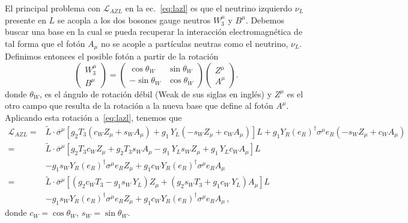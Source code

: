 El principal problema con $\mathcal{L}_{AZL}$ en la ec.~\eqref{eq:lazl} es que el neutrino izquierdo $\nu_L$ presente en $L$ se acopla a los dos bosones gauge neutros $W_3^{\mu}$ y $B^{\mu}$. Debemos buscar una base en la cual se pueda recuperar la interacción electromagnética de tal forma que el fotón $A_{\mu}$ no se acople a partículas neutras como el neutrino, $\nu_L$. Definimos entonces el posible fotón a partir de la rotación
\begin{equation}
\label{eq:rottw}
  \begin{pmatrix}
    W_3^\mu\\
    B^\mu
  \end{pmatrix}=\begin{pmatrix}
    \cos\theta_W & \sin\theta_W\\
    -\sin\theta_W& \cos\theta_W
  \end{pmatrix}
  \begin{pmatrix}
    Z^\mu\\
    A^\mu
  \end{pmatrix}.
\end{equation}
donde $\theta_{W}$, es el ángulo de rotación débil (Weak de sus siglas en inglés) y $Z^{\mu}$ es el otro campo que resulta de la rotación a la nueva base que define al fotón $A^{\mu}$.
Aplicando esta rotación a~\eqref{eq:lazl}, tenemos que
\begin{align}
\label{eq:brot}
   \mathcal{L}_{A Z L}=& \widetilde{L}\cdot\overline{\sigma}^\mu\left[g_2 T_3(c_W Z_\mu+s_W A_\mu)+{g_1}\,Y_L(-s_W Z_\mu+c_W A_\mu)\right]L
    +g_1 Y_R\left(e_R \right)^{\dagger}\sigma^\mu  {e_R} (-s_W Z_\mu+c_W A_\mu)\nonumber\\
     =& \widetilde{L}\cdot\overline{\sigma}^\mu\left[g_2 T_3c_W Z_\mu+g_2 T_3s_W A_\mu-{g_1}\,Y_Ls_W Z_\mu+{g_1}\,Y_Lc_W A_\mu\right]L\nonumber\\
&-g_1 s_W Y_R\left(e_R \right)^{\dagger}\sigma^\mu  {e_R}Z_{\mu}  +g_1 c_W Y_R\left(e_R \right)^{\dagger}\sigma^\mu  {e_R}A_{\mu}  \nonumber\\
    =& \widetilde{L}\cdot\overline{\sigma}^\mu\left[\left(g_2 c_WT_3-{g_1}s_W\,Y_L\right)Z_\mu
       +\left(g_2 s_W T_3+{g_1}c_W\,Y_L\right) A_\mu\right]L \nonumber\\
&-g_1 s_W Y_R\left(e_R \right)^{\dagger}\sigma^\mu  {e_R}Z_{\mu}  +g_1 c_W Y_R\left(e_R \right)^{\dagger}\sigma^\mu  {e_R}A_{\mu}  \,,
\end{align}
donde $c_W=\cos\theta_W$, $s_W=\sin\theta_W$. 


